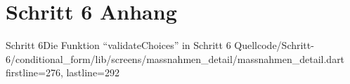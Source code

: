 \chapter{Schritt 6 Anhang} 
\label{appendix:Schritt6Anhang}

\begin{alexlisting}{Schritt 6}{Die Funktion \enquote{validateChoices} in Schritt 6}
    {Quellcode/Schritt-6/conditional_form/lib/screens/massnahmen_detail/massnahmen_detail.dart}
    {firstline=276, lastline=292}
    \label{lst:Schritt6validateChoices}
  \end{alexlisting}
